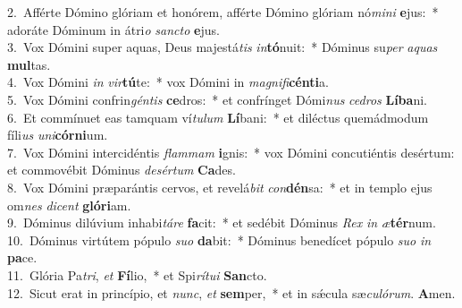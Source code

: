 {2.~}Afférte Dómino glóriam et honórem, afférte Dómino glóriam nó\textit{mi}\textit{ni} \textbf{e}jus:~* adoráte Dóminum in átri\textit{o} \textit{san}\textit{cto} \textbf{e}jus.\\
{3.~}Vox Dómini super aquas, Deus majestá\textit{tis} \textit{in}\textbf{tó}nuit:~* Dóminus su\textit{per} \textit{a}\textit{quas} \textbf{mul}tas.\\
{4.~}Vox Dómini \textit{in} \textit{vir}\textbf{tú}te:~* vox Dómini in \textit{ma}\textit{gni}\textit{fi}\textbf{cén}\textbf{ti}a.\\
{5.~}Vox Dómini confrin\textit{gén}\textit{tis} \textbf{ce}dros:~* et confrínget Dómi\textit{nus} \textit{ce}\textit{dros} \textbf{Lí}\textbf{ba}ni.\\
{6.~}Et commínuet eas tamquam ví\textit{tu}\textit{lum} \textbf{Lí}bani:~* et diléctus quemádmodum fíli\textit{us} \textit{u}\textit{ni}\textbf{cór}\textbf{ni}um.\\
{7.~}Vox Dómini intercidéntis \textit{flam}\textit{mam} \textbf{i}gnis:~* vox Dómini concutiéntis desértum: et commovébit Dóminus \textit{de}\textit{sér}\textit{tum} \textbf{Ca}des.\\
{8.~}Vox Dómini præparántis cervos, et revelá\textit{bit} \textit{con}\textbf{dén}sa:~* et in templo ejus om\textit{nes} \textit{di}\textit{cent} \textbf{gló}\textbf{ri}am.\\
{9.~}Dóminus dilúvium inhabi\textit{tá}\textit{re} \textbf{fa}cit:~* et sedébit Dóminus \textit{Rex} \textit{in} \textit{æ}\textbf{tér}num.\\
{10.~}Dóminus virtútem pópulo \textit{su}\textit{o} \textbf{da}bit:~* Dóminus benedícet pópulo \textit{su}\textit{o} \textit{in} \textbf{pa}ce.\\
{11.~}Glória Pa\textit{tri}, \textit{et} \textbf{Fí}lio,~* et Spi\textit{rí}\textit{tu}\textit{i} \textbf{San}cto.\\
{12.~}Sicut erat in princípio, et \textit{nunc}, \textit{et} \textbf{sem}per,~* et in sǽcula sæ\textit{cu}\textit{ló}\textit{rum}. \textbf{A}men.\\
